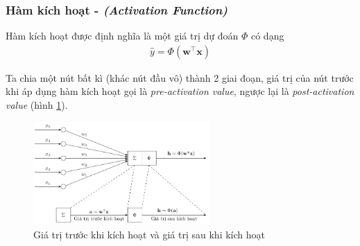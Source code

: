 \subsubsection{Hàm kích hoạt - \textit{(Activation Function)}}
Hàm kích hoạt được định nghĩa là một giá trị dự đoán $\Phi$ có dạng
\begin{align}
    \hat{y}=\Phi(\mathbf{w}^\intercal\mathbf{x})
\end{align}

Ta chia một nút bất kì (khác nút đầu vô) thành 2 giai đoạn, giá trị của nút trước khi áp dụng hàm kích hoạt gọi là \textit{pre-activation value}, ngược lại là \textit{post-activation value} (hình \ref{figure:pre-post-activation-value}).
\begin{figure}[htb]
    \centering
    \includegraphics[width=0.6\textwidth]{tikz_image/pre_post_activation_value.pdf}
    \caption{Giá trị trước khi kích hoạt và giá trị sau khi kích hoạt}
    \label{figure:pre-post-activation-value}
\end{figure}

